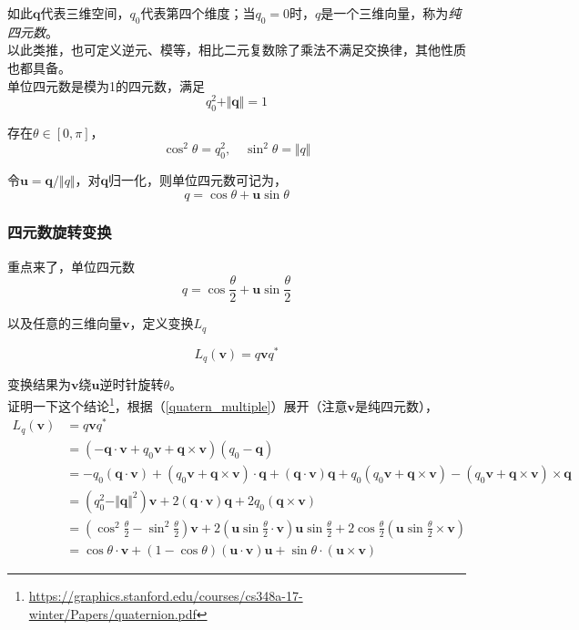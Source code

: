\documentclass[hpyerref,UTF8,a4paper,titlepage,12pt,oneside]{ctexbook}
\theoremstyle{definition}
\begin{document}
如此$\mathbf{q}$代表三维空间，$q_0$代表第四个维度；当$q_0=0$时，$q$是一个三维向量，称为\textit{纯四元数}。\\

以此类推，也可定义逆元、模等，相比二元复数除了乘法不满足交换律，其他性质也都具备。\\

单位四元数是模为1的四元数，满足
$$
	q_0^2 +\Vert \mathbf{q}\Vert = 1
$$

存在$\theta \in[0,\pi]$，
$$
	\cos^2\theta = q_0^2, \quad \sin^2\theta = \Vert q\Vert
$$

令$\mathbf{u} = \mathbf{q}/\Vert q\Vert$，对$\mathbf{q}$归一化，则单位四元数可记为，
$$
	q = \cos\theta +  \mathbf{u}\sin\theta
$$

\subsubsection*{四元数旋转变换}

重点来了，单位四元数
$$
	q = \cos\frac{\theta}{2} + \mathbf{u}\sin\frac{\theta}{2}
$$

以及任意的三维向量$\mathbf{v}$，定义变换$L_q$

\begin{equation}
	L_q(\mathbf{v}) = q\mathbf{v}q^*\label{quaternion_rotation}
\end{equation}

变换结果为$\mathbf{v}$绕$\mathbf{u}$逆时针旋转$\theta$。\\

证明一下这个结论\footnote{\url{https://graphics.stanford.edu/courses/cs348a-17-winter/Papers/quaternion.pdf}}，根据（\ref{quatern_multiple}）展开（注意$\mathbf{v}$是纯四元数），
	\begin{align*}
		L_q(\mathbf{v}) 
			&= q \mathbf{v}q^*\\
			& = (-\mathbf{q} \cdot \mathbf{v} + q_0 \mathbf{v} + \mathbf{q}\times \mathbf{v})(q_0 - \mathbf{q})\\
			&= -q_0(\mathbf{q}\cdot \mathbf{v}) 
				+ (q_0 \mathbf{v} + \mathbf{q}\times \mathbf{v})\cdot\mathbf{q} 
				+ (\mathbf{q}\cdot \mathbf{v})\mathbf{q}
				+ q_0(q_0 \mathbf{v} + \mathbf{q}\times \mathbf{v})
				- (q_0 \mathbf{v} + \mathbf{q}\times \mathbf{v}) \times \mathbf{q}\\
			&= (q^2_0 - \Vert \mathbf{q}\Vert^2)\mathbf{v} + 2(\mathbf{q}\cdot \mathbf{v})\mathbf{q} +2q_0(\mathbf{q}\times \mathbf{v})\\
			&= \left( \cos^2\frac{\theta}{2} - \sin^2\frac{\theta}{2}\right)\mathbf{v}
				+ 2\left(\mathbf{u} \sin\frac{\theta}{2}\cdot \mathbf{v}\right) \mathbf{u} \sin\frac{\theta}{2}
				+ 2\cos\frac{\theta}{2}\left( \mathbf{u} \sin\frac{\theta}{2} \times \mathbf{v}\right)\\
			&= \cos\theta\cdot \mathbf{v} + (1 -\cos\theta)(\mathbf{u}\cdot \mathbf{v})\mathbf{u} +\sin\theta\cdot(\mathbf{u}\times \mathbf{v})
	\end{align*}
\end{document}
